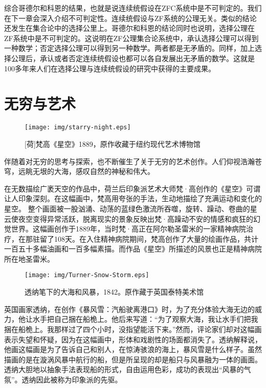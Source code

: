\documentclass{article}
\begin{document}
综合哥德尔和科恩的结果，也就是说连续统假设在ZFC系统中是不可判定的。我们在下一章会深入介绍不可判定性。连续统假设与ZF系统的公理无关。类似的结论还发生在集合论中的选择公里上。哥德尔和科恩的结论同时也说明，选择公理在ZF系统中是不可判定的。这说明在ZF公理集合论系统中，承认选择公理可以得到一种数学；否定选择公理可以得到另一种数学。两者都是无矛盾的。同样，加上选择公理后，承认或者否定连续统假设也都可以各自发展出无矛盾的数学。这就是100多年来人们在选择公理与连续统假设的研究中获得的主要成果\cite{GCH}。

\section{无穷与艺术}

\begin{figure}[htbp]
 \centering
 \texttt{[image: img/starry-night.eps]}
 \captionsetup{labelformat=empty}
 \caption{[荷]梵高《星空》1889，原作收藏于纽约现代艺术博物馆}
 \label{fig:starry-night}
\end{figure}

伴随着对无穷的思考与探索，也不断催生了关于无穷的艺术创作。人们仰视浩瀚苍穹，远眺无垠的大海，感叹自然的神秘和伟大。

在无数描绘广袤天空的作品中，荷兰后印象派艺术大师梵·高创作的《星空》可谓让人印象深刻。在这幅画中，梵高用夸张的手法，生动地描绘了充满运动和变化的星空。 整个画面被一股汹涌、动荡的蓝绿色激流所吞噬，旋转、躁动、卷曲的星云使夜空变得异常活跃，脱离现实的景象反映出梵·高躁动不安的情感和疯狂的幻觉世界。这幅画创作于1889年，当时梵·高正在阿尔勒圣雷米的一家精神病院治疗，在那驻留了108天。在入住精神病院期间，梵高创作了大量的绘画作品，共计一百五十多幅油画和一百多幅素描。而作品《星空》所描述的风景也正是精神病院所在地圣雷米。

\begin{figure}[htbp]
 \centering
 \texttt{[image: img/Turner-Snow-Storm.eps]}
 \captionsetup{labelformat=empty}
 \caption{透纳笔下的大海和风暴，1842。原作藏于英国泰特美术馆}
 \label{fig:Turner-Snow-Storm}
\end{figure}

英国画家透纳，在创作《暴风雪：汽船驶离港口》时，为了充分体验大海无边的威力，他让水手把自己捆在船桅上。他后来写道：“为了观察大海，我让水手们把我捆在船桅上。我那样过了四个小时，没指望能活下来。”然而，评论家们却对这幅画表示失望和怀疑，因为在这幅画中，形体和戏剧性的场面都消失了。透纳解释说，他画这幅画是为了告诉自己和别人，在惊涛骇浪的海上，暴风雪是什么样子。虽然描画的是在漩涡风暴中航行的船，但是所呈现的却是船只与风暴融为一体的画面。透纳大胆地以抽象手法表现船的形式，自由运用色彩，成功的表现出“风暴的气氛”。透纳因此被称为印象派的先驱。
\end{document}
